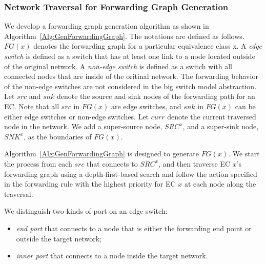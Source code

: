\subsubsection{Network Traversal for Forwarding Graph Generation}

We develop a forwarding graph generation algorithm as shown in Algorithm~\ref{Alg:GenForwardingGraph}.
The notations are defined as follows.
$FG(x)$ denotes the forwarding graph for a particular equivalence class x.
A \textit{edge switch} is defined as a switch that has at least one link to a node located outside of the original network. 
A \textit{non-edge switch} is defined as a switch with all connected nodes that are inside of the oritinal network.
The forwarding behavior of the non-edge switches are not considered in the big switch model abstraction.
Let $src$ and $snk$ denote the source and sink nodes of the forwarding path for an EC.
Note that all $src$ in $FG(x)$ are edge switches,
and $snk$ in $FG(x)$ can be either edge switches or non-edge switches.
Let $curr$ denote the current traversed node in the network.
We add a super-source node, $SRC^x$, and a super-sink node, $SNK^x$, as the boundaries of $FG(x)$.

Algorithm~\ref{Alg:GenForwardingGraph} is designed to generate $FG(x)$.
We start the process from each $src$ that connects to $SRC^x$,
and then traverse EC $x$'s forwarding graph using a depth-first-based search and
follow the action specified in the forwarding rule with the highest priority for EC $x$ at each node along the traversal.


We distinguish two kinds of port on an edge switch:
\begin{itemize}
\item \textit{end port} that connects to a node that is either the forwarding end point or outside the target network;
\item \textit{inner port} that connects to a node inside the target network.
\end{itemize}

